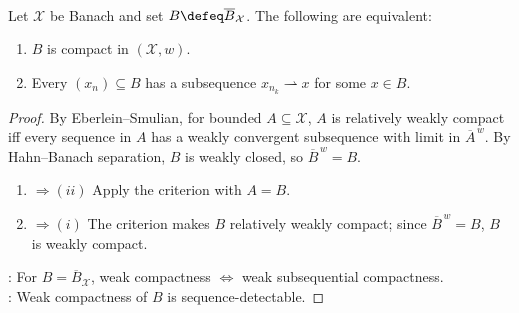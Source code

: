 \begin{theorem} \label{thm:eberlein-smulian-unit-ball} \\
Let $\mathcal{X}$ be Banach and set $B\defeq\overline{B}_{\mathcal{X}}$. The following are equivalent:
\begin{enumerate}[label=(\roman*)]
\setlength{\itemsep}{0pt}
\item $B$ is compact in $(\mathcal{X},w)$.
\item Every $(x_n)\subseteq B$ has a subsequence $x_{n_k}\rightharpoonup x$ for some $x\in B$.
\end{enumerate}
\begin{proof}
By Eberlein--Smulian, for bounded $A\subseteq\mathcal{X}$, $A$ is relatively weakly compact iff every sequence in $A$ has a weakly convergent subsequence with limit in $\overline{A}^{\,w}$. By Hahn--Banach separation, $B$ is weakly closed, so $\overline{B}^{\,w}=B$.
\begin{enumerate}[label=(\roman*)]
\setlength{\itemsep}{0pt}
\item[$(i)$]$\Rightarrow (ii)$ Apply the criterion with $A=B$.
\item[$(ii)$]$\Rightarrow (i)$ The criterion makes $B$ relatively weakly compact; since $\overline{B}^{\,w}=B$, $B$ is weakly compact.
\end{enumerate}
: For $B=\overline{B}_{\mathcal X}$, weak compactness $\Longleftrightarrow$ weak subsequential compactness.\\
: Weak compactness of $B$ is sequence-detectable.
\end{proof}
\end{theorem}


